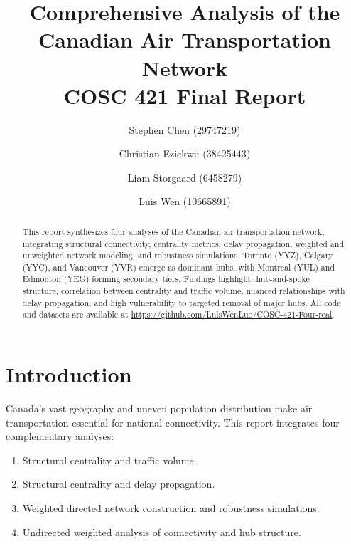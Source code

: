 \documentclass{svproc}
\begin{document}
\mainmatter              %

\title{Comprehensive Analysis of the Canadian Air Transportation Network\\COSC 421 Final Report}

\author{Stephen Chen (29747219) \and Christian Eziekwu (38425443) \and Liam Storgaard (6458279) \and Luis Wen (10665891)}


\maketitle

\begin{abstract}
This report synthesizes four analyses of the Canadian air transportation network, integrating structural connectivity, centrality metrics, delay propagation, weighted and unweighted network modeling, and robustness simulations. Toronto (YYZ), Calgary (YYC), and Vancouver (YVR) emerge as dominant hubs, with Montreal (YUL) and Edmonton (YEG) forming secondary tiers. Findings highlight: hub-and-spoke structure, correlation between centrality and traffic volume, nuanced relationships with delay propagation, and high vulnerability to targeted removal of major hubs. All code and datasets are available at \url{https://github.com/LuisWenLuo/COSC-421-Four-real}.
\end{abstract}

\section{Introduction}
Canada's vast geography and uneven population distribution make air transportation essential for national connectivity. This report integrates four complementary analyses:

\begin{enumerate}[label=\arabic*.]
    \item Structural centrality and traffic volume.
    \item Structural centrality and delay propagation.
    \item Weighted directed network construction and robustness simulations.
    \item Undirected weighted analysis of connectivity and hub structure.
\end{enumerate}
\end{document}
